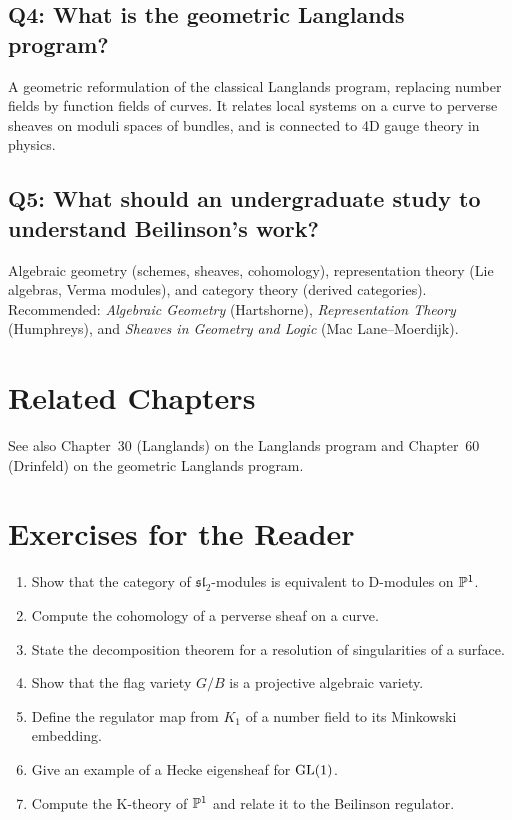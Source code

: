 \subsection*{Q4: What is the geometric Langlands program?}
A geometric reformulation of the classical Langlands program, replacing number fields by function fields of curves. It relates local systems on a curve to perverse sheaves on moduli spaces of bundles, and is connected to 4D gauge theory in physics.

\subsection*{Q5: What should an undergraduate study to understand Beilinson's work?}
Algebraic geometry (schemes, sheaves, cohomology), representation theory (Lie algebras, Verma modules), and category theory (derived categories). Recommended: \textit{Algebraic Geometry} (Hartshorne), \textit{Representation Theory} (Humphreys), and \textit{Sheaves in Geometry and Logic} (Mac Lane--Moerdijk).

\section{Related Chapters}
See also Chapter~30 (Langlands) on the Langlands program and Chapter~60 (Drinfeld) on the geometric Langlands program.

\section*{Exercises for the Reader}

\begin{enumerate}
    \item [A] Show that the category of $\mathfrak{sl}_2$-modules is equivalent to D-modules on $\P^1$.
    \item [A] Compute the cohomology of a perverse sheaf on a curve.
    \item [B] State the decomposition theorem for a resolution of singularities of a surface.
    \item [I] Show that the flag variety $G/B$ is a projective algebraic variety.
    \item [I] Define the regulator map from $K_1$ of a number field to its Minkowski embedding.
    \item [B] Give an example of a Hecke eigensheaf for $\GL(1)$.
    \item [A] Compute the K-theory of $\P^1$ and relate it to the Beilinson regulator.
\end{enumerate}

